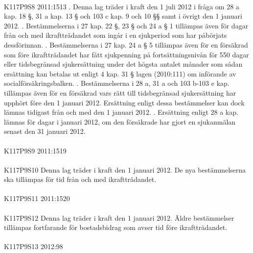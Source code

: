 \documentclass[a4paper,notitlepage,openany,10pt]{book}
\begin{document}
\paragraph*{}
{\tiny K117P9S8}
2011:1513
. Denna lag träder i kraft den 1 juli 2012 i fråga om 28 a kap. 18 §, 31 a kap. 13 § och 103 c kap. 9 och 10 §§ samt i övrigt den 1 januari 2012.
. Bestämmelserna i 27 kap. 22 §, 23 § och 24 a § 1 tillämpas även för dagar från och med ikraftträdandet som ingår i en sjukperiod som har påbörjats dessförinnan.
. Bestämmelserna i 27 kap. 24 a § 5 tillämpas även för en försäkrad som före ikraftträdandet har fått sjukpenning på fortsättningsnivån för 550 dagar eller tidsbegränsad sjukersättning under det högsta antalet månader som sådan ersättning kan betalas ut enligt 4 kap. 31 § lagen (2010:111) om införande av socialförsäkringsbalken.
. Bestämmelserna i 28 a, 31 a och 103 b-103 e kap. tillämpas även för en försäkrad vars rätt till tidsbegränsad sjukersättning har upphört före den 1 januari 2012. Ersättning enligt dessa bestämmelser kan dock lämnas tidigast från och med den 1 januari 2012.
. Ersättning enligt 28 a kap. lämnas för dagar i januari 2012, om den försäkrade har gjort en sjukanmälan senast den 31 januari 2012.
\paragraph*{}
{\tiny K117P9S9}
2011:1519
\paragraph*{}
{\tiny K117P9S10}
Denna lag träder i kraft den 1 januari 2012. De nya bestämmelserna ska tillämpas för tid från och med ikraftträdandet.
\paragraph*{}
{\tiny K117P9S11}
2011:1520
\paragraph*{}
{\tiny K117P9S12}
Denna lag träder i kraft den 1 januari 2012. Äldre bestämmelser tillämpas fortfarande för bostadsbidrag som avser tid före ikraftträdandet.
\paragraph*{}
{\tiny K117P9S13}
2012:98
\end{document}
